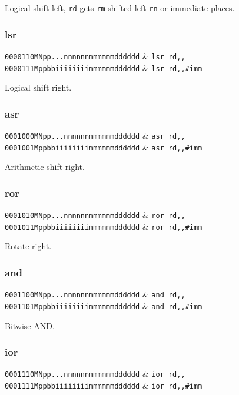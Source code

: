 Logical shift left, \texttt{rd} gets \texttt{rm} shifted left \texttt{rn} or immediate places.

\subsubsection{lsr}

\decfmt
\texttt{0000110MNpp...nnnnnnmmmmmmdddddd} & \texttt{lsr rd,,}\\
\texttt{0000111Mppbbiiiiiiiimmmmmmdddddd} & \texttt{lsr rd,,\#imm}
\finfmt

Logical shift right.

\subsubsection{asr}

\decfmt
\texttt{0001000MNpp...nnnnnnmmmmmmdddddd} & \texttt{asr rd,,}\\
\texttt{0001001Mppbbiiiiiiiimmmmmmdddddd} & \texttt{asr rd,,\#imm}
\finfmt

Arithmetic shift right.

\subsubsection{ror}

\decfmt
\texttt{0001010MNpp...nnnnnnmmmmmmdddddd} & \texttt{ror rd,,}\\
\texttt{0001011Mppbbiiiiiiiimmmmmmdddddd} & \texttt{ror rd,,\#imm}
\finfmt

Rotate right.

\subsubsection{and}

\decfmt
\texttt{0001100MNpp...nnnnnnmmmmmmdddddd} & \texttt{and rd,,}\\
\texttt{0001101Mppbbiiiiiiiimmmmmmdddddd} & \texttt{and rd,,\#imm}
\finfmt

Bitwise AND.

\subsubsection{ior}

\decfmt
\texttt{0001110MNpp...nnnnnnmmmmmmdddddd} & \texttt{ior rd,,}\\
\texttt{0001111Mppbbiiiiiiiimmmmmmdddddd} & \texttt{ior rd,,\#imm}
\finfmt

